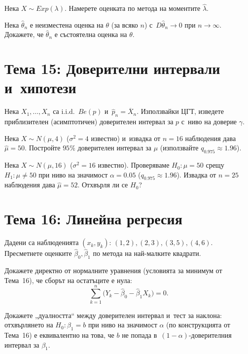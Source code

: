 \begin{probbox}[Задача 14.2]
Нека $X\sim Exp(\lambda)$. Намерете оценката по метода на моментите
$\hat\lambda$.
\end{probbox}

\begin{probbox}[Задача 14.3]
Нека $\hat\theta_n$ е неизместена оценка на $\theta$ (за всяко $n$) с~$D\hat\theta_n\to0$ при $n\to\infty$. Докажете, че $\hat\theta_n$ е
състоятелна оценка на $\theta$.
\end{probbox}

\section*{Тема 15: Доверителни интервали и~хипотези}

\begin{probbox}[Задача 15.1]
Нека $X_1,\dots,X_n$ са i.i.d.\ $Be(p)$ и~$\hat p_n=\overline X_n$.
Използвайки ЦГТ, изведете приблизителен (асимптотичен) доверителен
интервал за $p$ с~ниво на доверие $\gamma$.
\end{probbox}

\begin{probbox}[Задача 15.2]
Нека $X\sim N(\mu,4)$ ($\sigma^2=4$ известно) и~извадка от $n=16$
наблюдения дава $\hat\mu=50$. Постройте $95\%$ доверителен интервал
за $\mu$ (използвайте $q_{0.975}\approx1.96$).
\end{probbox}

\begin{probbox}[Задача 15.3]
Нека $X\sim N(\mu,16)$ ($\sigma^2=16$ известно). Проверяваме $H_0:
\mu=50$ срещу $H_1:\mu\neq50$ при ниво на значимост $\alpha=0.05$
($q_{0.975}\approx1.96$). Извадка от $n=25$ наблюдения дава
$\hat\mu=52$. Отхвърля ли се $H_0$?
\end{probbox}

\section*{Тема 16: Линейна регресия}

\begin{probbox}[Задача 16.1]
Дадени са наблюденията $(x_k,y_k)$: $(1,2),(2,3),(3,5),(4,6)$.
Пресметнете оценките $\hat\beta_0,\hat\beta_1$ по метода на
най-малките квадрати.
\end{probbox}

\begin{probbox}[Задача 16.2]
Докажете директно от нормалните уравнения (условията за минимум от
Тема~16), че сборът на остатъците е нула:
\[
  \sum_{k=1}^n\big(Y_k-\hat\beta_0-\hat\beta_1X_k\big) = 0.
\]
\end{probbox}

\begin{probbox}[Задача 16.3]
Докажете „дуалността“ между доверителен интервал и~тест за наклона:
отхвърлянето на $H_0:\beta_1=b$ при ниво на значимост $\alpha$ (по
конструкцията от Тема~16) е еквивалентно на това, че $b$ не попада в~$(1-\alpha)$-доверителния интервал за $\beta_1$.
\end{probbox}
